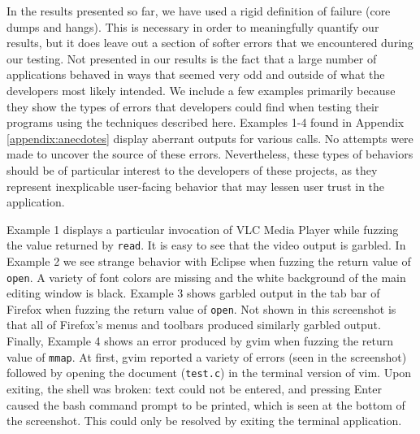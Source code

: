 In the results presented so far, we have used a rigid definition of failure (core dumps and hangs). This is necessary in order to meaningfully quantify our results, but it does leave out a section of softer errors that we encountered during our testing. Not presented in our results is the fact that a large number of applications behaved in ways that seemed very odd and outside of what the developers most likely intended. We include a few examples primarily because they show the types of errors that developers could find when testing their programs using the techniques described here. Examples 1-4 found in Appendix \ref{appendix:anecdotes} display aberrant outputs for various calls. No attempts were made to uncover the source of these errors. Nevertheless, these types of behaviors should be of particular interest to the developers of these projects, as they represent inexplicable user-facing behavior that may lessen user trust in the application.

Example 1 displays a particular invocation of VLC Media Player while fuzzing the value returned by \texttt{read}. It is easy to see that the video output is garbled. In Example 2 we see strange behavior with Eclipse when fuzzing the return value of \texttt{open}. A variety of font colors are missing and the white background of the main editing window is black. Example 3 shows garbled output in the tab bar of Firefox when fuzzing the return value of \texttt{open}. Not shown in this screenshot is that all of Firefox's menus and toolbars produced similarly garbled output. Finally, Example 4 shows an error produced by gvim when fuzzing the return value of \texttt{mmap}. At first, gvim reported a variety of errors (seen in the screenshot) followed by opening the document (\texttt{test.c}) in the terminal version of vim. Upon exiting, the shell was broken: text could not be entered, and pressing Enter caused the bash command prompt to be printed, which is seen at the bottom of the screenshot. This could only be resolved by exiting the terminal application.